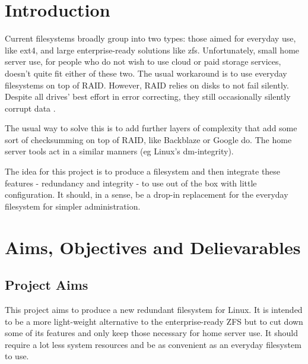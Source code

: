 %
%
\section{Introduction}

    Current filesystems broadly group into two types: those aimed for everyday
    use, like ext4, and large enterprise-ready solutions like zfs.
    Unfortunately, small home server use, for people who do not wish to use
    cloud or paid storage services, doesn't quite fit either of these two. The
    usual workaround is to use everyday filesystems on top of RAID. However,
    RAID relies on disks to not fail silently. Despite all drives' best effort
    in error correcting, they still occasionally silently corrupt data
    \cite{google_flash, facebook_flash}.

    The usual way to solve this is to add further layers of complexity that
    add some sort of checksumming on top of RAID, like Backblaze
    \cite{backblaze} or Google \cite{google_fs} do. The home server tools act
    in a similar manners (eg Linux's dm-integrity).

    The idea for this project is to produce a filesystem and then integrate
    these features - redundancy and integrity - to use out of the box with
    little configuration. It should, in a sense, be a drop-in replacement for
    the everyday filesystem for simpler administration.

%
%
\section{Aims, Objectives and Delievarables}

\subsection{Project Aims}

    This project aims to produce a new redundant filesystem for Linux. It is
    intended to be a more light-weight alternative to the enterprise-ready ZFS
    but to cut down some of its features and only keep those necessary for home
    server use. It should require a lot less system resources and be as
    convenient as an everyday filesystem to use.

